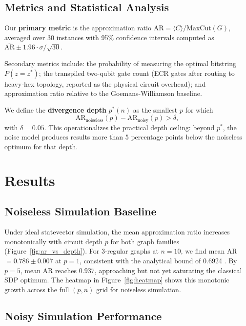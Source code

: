 \documentclass[12pt]{article}
\begin{document}
\subsection{Metrics and Statistical Analysis}

Our \textbf{primary metric} is the approximation ratio $\text{AR} = \langle C \rangle / \text{MaxCut}(G)$, averaged over 30 instances with 95\% confidence intervals computed as $\bar{\text{AR}} \pm 1.96 \cdot \sigma / \sqrt{30}$.

Secondary metrics include: the probability of measuring the optimal bitstring $P(z = z^*)$; the transpiled two-qubit gate count (ECR gates after routing to heavy-hex topology, reported as the physical circuit overhead); and approximation ratio relative to the Goemans-Williamson baseline.

We define the \textbf{divergence depth} $p^*(n)$ as the smallest $p$ for which
\[
\text{AR}_{\text{noiseless}}(p) - \text{AR}_{\text{noisy}}(p) > \delta,
\]
with $\delta = 0.05$. This operationalizes the practical depth ceiling: beyond $p^*$, the noise model produces results more than 5 percentage points below the noiseless optimum for that depth.

\section{Results}

\subsection{Noiseless Simulation Baseline}

Under ideal statevector simulation, the mean approximation ratio increases monotonically with circuit depth $p$ for both graph families (Figure~\ref{fig:ar_vs_depth}). For 3-regular graphs at $n = 10$, we find mean AR $= 0.786 \pm 0.007$ at $p = 1$, consistent with the analytical bound of 0.6924 \cite{farhi2014qaoa}. By $p = 5$, mean AR reaches $0.937$, approaching but not yet saturating the classical SDP optimum. The heatmap in Figure~\ref{fig:heatmap} shows this monotonic growth across the full $(p, n)$ grid for noiseless simulation.

\subsection{Noisy Simulation Performance}
\end{document}
